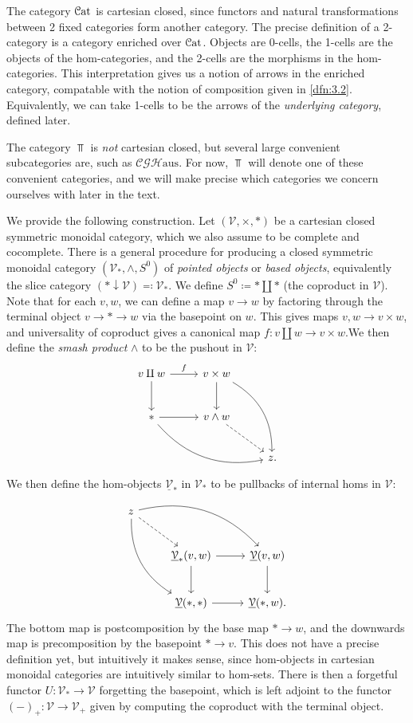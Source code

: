 The category $\mathcal{C}\mathrm{at} $ is cartesian closed, since functors and natural transformations between 2 fixed categories form another category. The precise definition of a 2-category is a category enriched over $\mathcal{C}\mathrm{at} $. Objects are 0-cells, the 1-cells are the objects of the hom-categories, and the 2-cells are the morphisms in the hom-categories. This interpretation gives us a notion of arrows in the enriched category, compatable with the notion of composition given in \cref{dfn:3.2}. Equivalently, we can take 1-cells to be the arrows of the \emph{underlying category}, defined later.

The category $\Top $ is \emph{not} cartesian closed, but several large convenient subcategories are, such as $\mathcal{C} \mathcal{G} \mathcal{H} \mathrm{aus} $. For now, $\Top $ will denote one of these convenient categories, and we will make precise which categories we concern ourselves with later in the text.

We provide the following construction. Let $(\mathcal{V} ,\times ,*)$ be a cartesian closed symmetric monoidal category, which we also assume to be complete and cocomplete. There is a general procedure for producing a closed symmetric monoidal category $(\mathcal{V} _*,\wedge,S^0)$ of \emph{pointed objects} or \emph{based objects}, equivalently the slice category $(*\downarrow \mathcal{V} )\eqqcolon \mathcal{V} _*$. We define $S^0\coloneqq *\amalg *$ (the coproduct in $\mathcal{V}$). Note that for each $v,w$, we can define a map $v\to w$ by factoring through the terminal object $v\to *\to w$ via the basepoint on $w$. This gives maps $v,w\to v\times w$, and universality of coproduct gives a canonical map $f:v\amalg w \to v\times w$.We then define the \emph{smash product} $\wedge$ to be the pushout in $\mathcal{V} $:
\[\begin{tikzcd}[row sep = 2.5em, column sep = 2.5em]
v\amalg w\ar["f", r] \ar[d]  & v\times w\ar[d] \ar[bend left, ddr]  &  \\
*\ar[r] \ar[bend right, drr]  & v\wedge w \ar[dashed, dr] &  \\
 &  & z.
\end{tikzcd}\]
We then define the hom-objects $\underline{\mathcal{V} }_*$ in $\mathcal{V} _*$ to be pullbacks of internal homs in $\mathcal{V} $:
\[\begin{tikzcd}[row sep = 2.5em, column sep = 2.5em]
z\ar[bend left, drr] \ar[bend right, ddr] \ar[dashed, dr]  &  &  \\
							   & \underline{\mathcal{V} }_*(v,w)\ar[r] \ar[d]  & \underline{\mathcal{V} }(v,w)\ar[d]  \\
							   & \underline{\mathcal{V} }(*,*)\ar[r]  & \underline{\mathcal{V} }(*,w).
\end{tikzcd}\]
The bottom map is postcomposition by the base map $*\to w$, and the downwards map is precomposition by the basepoint $*\to v$. This does not have a precise definition yet, but intuitively it makes sense, since hom-objects in cartesian monoidal categories are intuitively similar to hom-sets. There is then a forgetful functor $U : \mathcal{V} _* \to \mathcal{V} $ forgetting the basepoint, which is left adjoint to the functor $(-)_+ : \mathcal{V}  \to \mathcal{V}_+ $ given by computing the coproduct with the terminal object.

